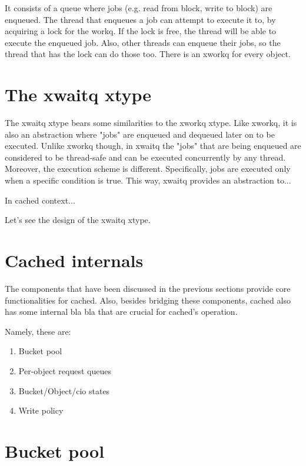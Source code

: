 
It consists of a queue where jobs (e.g.  read from block, write to block) are 
enqueued. The thread that enqueues a job can attempt to execute it to, by 
acquiring a lock for the workq. If the lock is free, the thread will be able to 
execute the enqueued job. Also, other threads can enqueue their jobs, so the 
thread that has the lock can do those too. There is an xworkq for every object.


\section{The xwaitq xtype}

The xwaitq xtype bears some similarities to the xworkq xtype. Like xworkq, it is 
also an abstraction where "jobs" are enqueued and dequeued later on to be 
executed. Unlike xworkq though, in xwaitq the "jobs" that are being enqueued are 
considered to be thread-safe and can be executed concurrently by any thread.  
Moreover, the execution scheme is different. Specifically, jobs are executed 
only when a specific condition is true. This way, xwaitq provides an abstraction 
to...

In cached context...

Let's see the design of the xwaitq xtype. 


\section{Cached internals}

The components that have been discussed in the previous sections provide core 
functionalities for cached. Also, besides bridging these components, cached also 
has some internal bla bla that are crucial for cached's operation.

Namely, these are:

\begin{enumerate}
	\item Bucket pool
	\item Per-object request queues
	\item Bucket/Object/cio states
	\item Write policy
\end{enumerate}

\section{Bucket pool}

